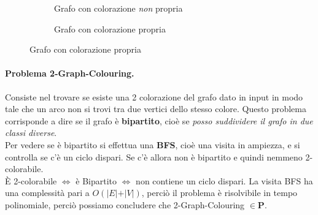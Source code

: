 \documentclass[a4paper]{article}
\theoremstyle{definition}
\newcommand{\p}{\mathbf{P}}
\begin{document}
			\begin{figure}[h!]
				\centering
				\begin{subfigure}{.5\textwidth}
					\centering
					\caption{Grafo con colorazione \textit{non} propria}
				\end{subfigure}%
				\begin{subfigure}{.5\textwidth}
					\centering
					\caption{Grafo con colorazione propria}
				\end{subfigure}%
			\end{figure}
			
			\paragraph{Problema 2-Graph-Colouring.}
			Consiste nel trovare se esiste una 2 colorazione del grafo dato in input in modo tale che un arco non si trovi tra due vertici dello stesso colore. Questo problema corrisponde a dire se il grafo è \textbf{bipartito}, cioè se \textit{posso suddividere il grafo in due classi diverse}. \\
			Per vedere se è bipartito si effettua una \textbf{BFS}, cioè una visita in ampiezza, e si controlla se c'è un ciclo dispari. Se c'è allora non è bipartito e quindi nemmeno 2-colorabile.\\
			
			\noindent
			È 2-colorabile $ \Leftrightarrow $ è Bipartito $ \Leftrightarrow $ non contiene un ciclo dispari. La visita BFS ha una complessità pari a $ O(\vert E \vert + \vert V \vert) $, perciò il problema è risolvibile in tempo polinomiale, perciò possiamo concludere che 2-Graph-Colouring $ \in \p $.
			
\end{document}
